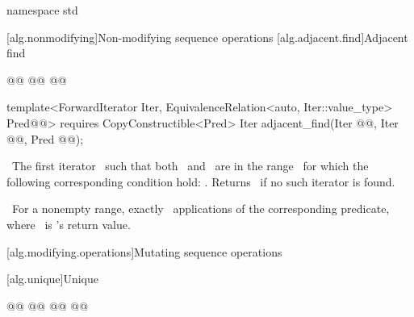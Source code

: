 \documentclass[american,twoside]{book}
\begin{document}
\begin{paras}
%

\color{black}
\begin{codeblock}
namespace std {
}
\end{codeblock}
\color{black}

[alg.nonmodifying]{Non-modifying sequence operations}
\setcounter{subsection}{7}
[alg.adjacent.find]{Adjacent find}

%
\begin{itemdecl}
@@
  @@
  @@

template<ForwardIterator Iter,
         EquivalenceRelation<auto, Iter::value_type> Pred@@>
  requires CopyConstructible<Pred>
  Iter adjacent_find(Iter @@, Iter @@, 
                     Pred @@);
\end{itemdecl}

\begin{itemdescr}
\pnum
\returns\ 
The first iterator
\
such that both
\tcode{i}\
and
\
are in
the range
\
for which
the following corresponding condition hold:
.
Returns \farg{last}\
if no such iterator is found.

\pnum
\complexity\ 
For a nonempty range, exactly
\
applications of the corresponding predicate, where \ is
\tcode{adjacent_find}'s
return value.
\end{itemdescr}

\rSec1[alg.modifying.operations]{Mutating sequence operations}

\setcounter{subsection}{8}
\rSec2[alg.unique]{Unique}

%
\begin{itemdecl}
@@
  @@
        @@
  @@


\end{itemdecl}
\end{paras}
\end{document}
